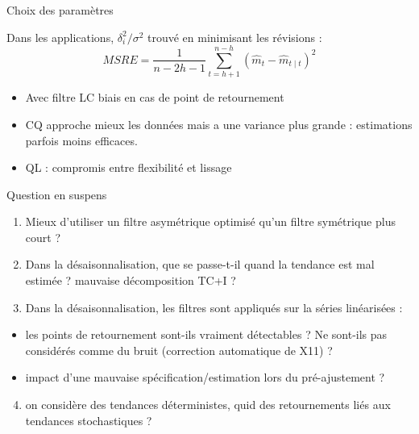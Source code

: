 \documentclass[10pt,xcolor=table,color={dvipsnames,usenames},ignorenonframetext,usepdftitle=false,french]{beamer}
\providecommand{\tightlist}{%
  \setlength{\parskip}{0pt}
  }
\begin{document}
\begin{frame}{Choix des paramètres}
\protect\hypertarget{choix-des-paramuxe8tres}{}

Dans les applications, \(\delta_i^2/\sigma^2\) trouvé en minimisant les
révisions : \[
MSRE=\frac{1}{n-2h-1}\sum_{t=h+1}^{n-h}(\hat{m}_{t}-\hat{m}_{t\mid t})^{2}
\] \pause

\begin{itemize}
\item
  Avec filtre LC biais en cas de point de retournement
\item
  CQ approche mieux les données mais a une variance plus grande :
  estimations parfois moins efficaces.
\item
  QL : compromis entre flexibilité et lissage
\end{itemize}

\end{frame}

\begin{frame}{Question en suspens}
\protect\hypertarget{question-en-suspens}{}

\begin{enumerate}
\item
  Mieux d'utiliser un filtre asymétrique optimisé qu'un filtre
  symétrique plus court ?
\item
  Dans la désaisonnalisation, que se passe-t-il quand la tendance est
  mal estimée ? mauvaise décomposition TC+I ?
\item
  Dans la désaisonnalisation, les filtres sont appliqués sur la séries
  linéarisées :
\end{enumerate}

\begin{itemize}
\item
  les points de retournement sont-ils vraiment détectables ? Ne sont-ils
  pas considérés comme du bruit (correction automatique de X11) ?
\item
  impact d'une mauvaise spécification/estimation lors du pré-ajustement
  ?
\end{itemize}

\begin{enumerate}
\setcounter{enumi}{3}
\tightlist
\item
  on considère des tendances déterministes, quid des retournements liés
  aux tendances stochastiques ?
\end{enumerate}

\end{frame}
\end{document}
